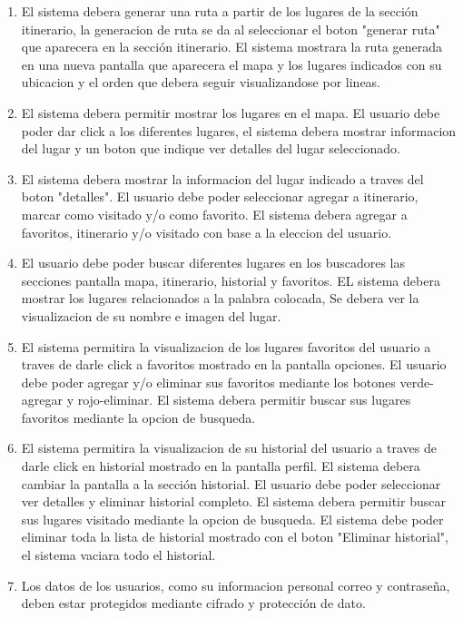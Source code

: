 \documentclass{article}
\begin{document}
\begin{enumerate}
\item El sistema debera generar una ruta a partir de los lugares de la sección itinerario, la generacion de ruta se da al seleccionar el boton "generar ruta" que aparecera en la sección itinerario. El sistema mostrara la ruta generada en una nueva pantalla que aparecera el mapa y los lugares indicados con su ubicacion y el orden que debera seguir visualizandose por lineas.

\item El sistema debera permitir mostrar los lugares en el mapa. El usuario debe poder dar click a los diferentes lugares, el sistema debera mostrar informacion del lugar y un boton que indique ver detalles del lugar seleccionado.

\item El sistema debera mostrar la informacion del lugar indicado a traves del boton "detalles". El usuario debe poder seleccionar agregar a itinerario, marcar como visitado y/o como favorito. El sistema debera agregar a favoritos, itinerario y/o visitado con base a la eleccion del usuario.

\item El usuario debe poder buscar diferentes lugares en los buscadores las secciones pantalla mapa, itinerario, historial y favoritos. EL sistema debera mostrar los lugares relacionados a la palabra colocada, Se debera ver la visualizacion de su nombre e imagen del lugar.

\item El sistema permitira la visualizacion de los lugares favoritos del usuario a traves de darle click a favoritos mostrado en la pantalla opciones. El usuario debe poder agregar y/o eliminar sus favoritos mediante los botones verde-agregar y rojo-eliminar. El sistema debera permitir buscar sus lugares favoritos mediante la opcion de busqueda.

\item El sistema permitira la visualizacion de su historial del usuario a traves de darle click en historial mostrado en la pantalla perfil. El sistema debera cambiar la pantalla a la sección historial. El usuario debe poder seleccionar ver detalles y eliminar historial completo. El sistema debera permitir buscar sus lugares visitado mediante la opcion de busqueda. El sistema debe poder eliminar toda la lista de historial mostrado con el boton "Eliminar historial", el sistema vaciara todo el historial.
    
    \item Los datos de los usuarios, como su informacion personal correo y contraseña, deben estar protegidos mediante cifrado y protección de dato.
    

\end{enumerate}
\end{document}
